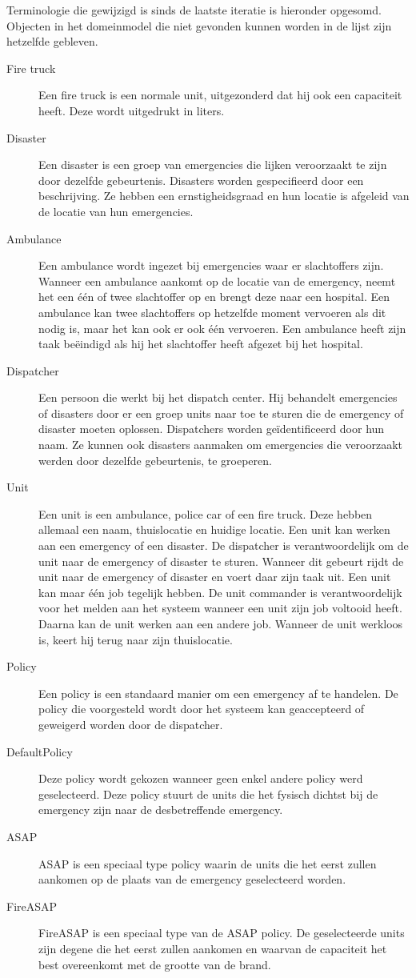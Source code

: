\label{terminologie}
Terminologie die gewijzigd is sinds de laatste iteratie is hieronder opgesomd. Objecten in het domeinmodel die niet gevonden kunnen worden in de lijst zijn hetzelfde gebleven. 
\begin{description}
  \item[Fire truck] Een fire truck is een normale unit, uitgezonderd dat hij ook een capaciteit heeft. Deze wordt uitgedrukt in liters.
  \item[Disaster] Een disaster is een groep van emergencies die lijken veroorzaakt te zijn door dezelfde gebeurtenis. Disasters worden gespecifieerd door een beschrijving. Ze hebben een ernstigheidsgraad en hun locatie is afgeleid van de locatie van hun emergencies.
    \item[Ambulance] Een ambulance wordt ingezet bij emergencies waar er slachtoffers zijn. Wanneer een ambulance aankomt op de locatie van de emergency, neemt het een \'e\'en of twee slachtoffer op en brengt deze naar een hospital. Een ambulance kan twee slachtoffers op hetzelfde moment vervoeren als dit nodig is, maar het kan ook er ook \'e\'en vervoeren. Een ambulance heeft zijn taak be\"eindigd als hij het slachtoffer heeft afgezet bij het hospital.
    \item[Dispatcher] Een persoon die werkt bij het dispatch center. Hij behandelt emergencies of disasters door er een groep units naar toe te sturen die de emergency of disaster moeten oplossen. Dispatchers worden ge\"identificeerd door hun naam. Ze kunnen ook disasters aanmaken om emergencies die veroorzaakt werden door dezelfde gebeurtenis, te groeperen.
        \item[Unit] Een unit is een ambulance, police car of een fire truck. Deze hebben allemaal een naam, thuislocatie en huidige locatie. Een unit kan werken aan een emergency of een disaster. De dispatcher is verantwoordelijk om de unit naar de emergency of disaster te sturen. Wanneer dit gebeurt rijdt de unit naar de emergency of disaster en voert daar zijn taak uit. Een unit kan maar \'e\'en job tegelijk hebben. De unit commander is verantwoordelijk voor het melden aan het systeem wanneer een unit zijn job voltooid heeft. Daarna kan de unit werken aan een andere job. Wanneer de unit werkloos is, keert hij terug naar zijn thuislocatie.
  \item[Policy]  Een policy is een standaard manier om een emergency af te handelen. De policy die voorgesteld wordt door het systeem kan geaccepteerd of geweigerd worden door de dispatcher.
  \item[DefaultPolicy] Deze policy wordt gekozen wanneer geen enkel andere policy werd geselecteerd. Deze policy stuurt de units die het fysisch dichtst bij de emergency zijn naar de desbetreffende emergency.
  \item[ASAP] ASAP is een speciaal type policy waarin de units die het eerst zullen aankomen op de plaats van de emergency geselecteerd worden.
  \item[FireASAP] FireASAP is een speciaal type van de ASAP policy. De geselecteerde units zijn degene die het eerst zullen aankomen en waarvan de capaciteit het best overeenkomt met de grootte van de brand.
\end{description}
